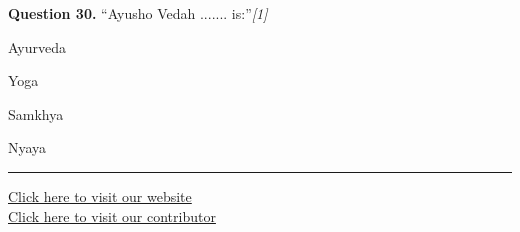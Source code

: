 \documentclass[11pt,a4paper]{article}
\newcommand{\pts}[1]{\hfill   \textit{[#1]}}
\begin{document}
\medskip




\noindent   \textbf{Question 30.} ``Ayusho Vedah ....... is:''\pts{1}

\begin{parts}
  \item Ayurveda
  \item Yoga
  \item Samkhya
  \item Nyaya
\end{parts}

\vfill
\rule{\linewidth}{0.4pt}

\begin{center}\small
\href{https://bhu-exam.vercel.app/}{Click here to visit our website}\\[4pt]
\href{https://me-aryan.vercel.app/}{Click here to visit our contributor}
\end{center}
\end{document}
